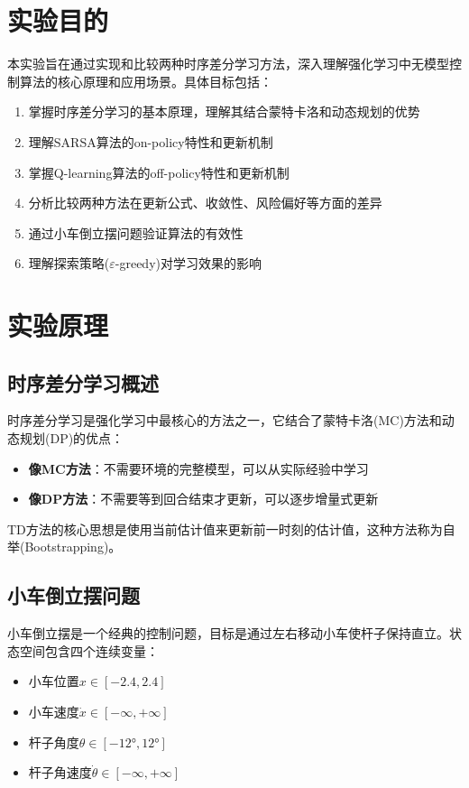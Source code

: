 \documentclass[12pt,a4paper]{article}
\begin{document}
\newpage

\section{实验目的}

本实验旨在通过实现和比较两种时序差分学习方法，深入理解强化学习中无模型控制算法的核心原理和应用场景。具体目标包括：

\begin{enumerate}
    \item 掌握时序差分学习的基本原理，理解其结合蒙特卡洛和动态规划的优势
    \item 理解SARSA算法的on-policy特性和更新机制
    \item 掌握Q-learning算法的off-policy特性和更新机制
    \item 分析比较两种方法在更新公式、收敛性、风险偏好等方面的差异
    \item 通过小车倒立摆问题验证算法的有效性
    \item 理解探索策略($\varepsilon$-greedy)对学习效果的影响
\end{enumerate}

\section{实验原理}

\subsection{时序差分学习概述}

时序差分学习是强化学习中最核心的方法之一，它结合了蒙特卡洛(MC)方法和动态规划(DP)的优点：

\begin{itemize}
    \item \textbf{像MC方法}：不需要环境的完整模型，可以从实际经验中学习
    \item \textbf{像DP方法}：不需要等到回合结束才更新，可以逐步增量式更新
\end{itemize}

TD方法的核心思想是使用当前估计值来更新前一时刻的估计值，这种方法称为自举(Bootstrapping)。

\subsection{小车倒立摆问题}

小车倒立摆是一个经典的控制问题，目标是通过左右移动小车使杆子保持直立。状态空间包含四个连续变量：
\begin{itemize}
    \item 小车位置$x \in [-2.4, 2.4]$
    \item 小车速度$\dot{x} \in [-\infty, +\infty]$
    \item 杆子角度$\theta \in [-12°, 12°]$
    \item 杆子角速度$\dot{\theta} \in [-\infty, +\infty]$
\end{itemize}
\end{document}
